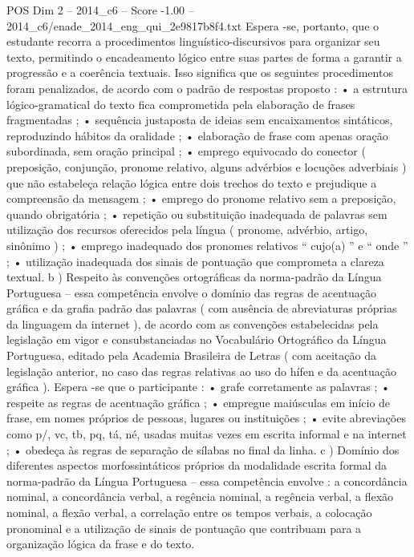 \begin{textsample}{POS Dim 2 – 2014\_c6 – Score -1.00 – 2014\_c6/enade\_2014\_eng\_qui\_2e9817b8f4.txt}
Espera -se, portanto, que o estudante recorra a procedimentos linguístico-discursivos para organizar seu texto, permitindo o encadeamento lógico entre suas partes de forma a garantir a progressão e a coerência textuais.
Isso significa que os seguintes procedimentos foram penalizados, de acordo com o padrão de respostas proposto : • a estrutura lógico-gramatical do texto fica comprometida pela elaboração de frases fragmentadas ; • sequência justaposta de ideias sem encaixamentos sintáticos, reproduzindo hábitos da oralidade ; • elaboração de frase com apenas oração subordinada, sem oração principal ; • emprego equivocado do conector ( preposição, conjunção, pronome relativo, alguns advérbios e locuções adverbiais ) que não estabeleça relação lógica entre dois trechos do texto e prejudique a compreensão da mensagem ; • emprego do pronome relativo sem a preposição, quando obrigatória ; • repetição ou substituição inadequada de palavras sem utilização dos recursos oferecidos pela língua ( pronome, advérbio, artigo, sinônimo ) ; • emprego inadequado dos pronomes relativos “ cujo(a) ” e “ onde ” ; • utilização inadequada dos sinais de pontuação que comprometa a clareza textual. b ) Respeito às convenções ortográficas da norma-padrão da Língua Portuguesa – essa competência envolve o domínio das regras de acentuação gráfica e da grafia padrão das palavras ( com ausência de abreviaturas próprias da linguagem da internet ), de acordo com as convenções estabelecidas pela legislação em vigor e consubstanciadas no Vocabulário Ortográfico da Língua Portuguesa, editado pela Academia Brasileira de Letras ( com aceitação da legislação anterior, no caso das regras relativas ao uso do hífen e da acentuação gráfica ).
Espera -se que o participante : • grafe corretamente as palavras ; • respeite as regras de acentuação gráfica ; • empregue maiúsculas em início de frase, em nomes próprios de pessoas, lugares ou instituições ; • evite abreviações como p/, vc, tb, pq, tá, né, usadas muitas vezes em escrita informal e na internet ; • obedeça às regras de separação de sílabas no final da linha. c ) Domínio dos diferentes aspectos morfossintáticos próprios da modalidade escrita formal da norma-padrão da Língua Portuguesa – essa competência envolve : a concordância nominal, a concordância verbal, a regência nominal, a regência verbal, a flexão nominal, a flexão verbal, a correlação entre os tempos verbais, a colocação pronominal e a utilização de sinais de pontuação que contribuam para a organização lógica da frase e do texto.

\end{textsample}
